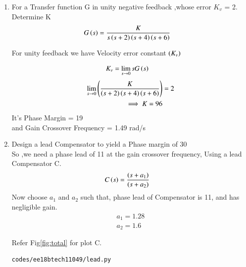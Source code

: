 \begin{enumerate}[label=\thesection.\arabic*.,ref=\thesection.\theenumi]

\item For a Transfer function G in unity negative feedback ,whose error  $K_v$ = 2. Determine K 
\begin{align}
G\brak{s} &= \frac{K}{s\brak{s+2}\brak{s+4}\brak{s+6}}
\label{eq:ee18btech11049_system}
\end{align}




\solution For unity feedback we have Velocity error constant $\left(K_v\right)$

\begin{align}
K_v &= \lim_{s \to 0} s G\left(s\right) 
\end{align}
\begin{align}
\lim_{s \to 0} \left(\frac{K}{\left(s+2\right)\left(s+4\right)\left(s+6\right)} \right)& = 2 \\
\implies K = 96
\end{align}
It's Phase Margin  = 19\degree\\
and Gain Crossover Frequency = 1.49 rad/s

\item Design a lead Compensator to yield a Phase margin of 30\degree \\
\solution So ,we need a phase lead of 11 at the gain crossover frequency, Using a lead Compensator C.
\begin{align}
    C\left(s\right) &= \frac{\left(s+a_1\right)}{\left(s+a_2\right)}
\end{align}{}
Now choose $a_1$ and $a_2$  such that, phase lead of Compensator is 11, and has negligible gain.
\begin{align}
    a_1 = 1.28\\
    a_2 = 1.6
\end{align}


Refer Fig\ref{fig:total} for plot C.
\begin{lstlisting}
codes/ee18btech11049/lead.py
\end{lstlisting}


\end{enumerate}
